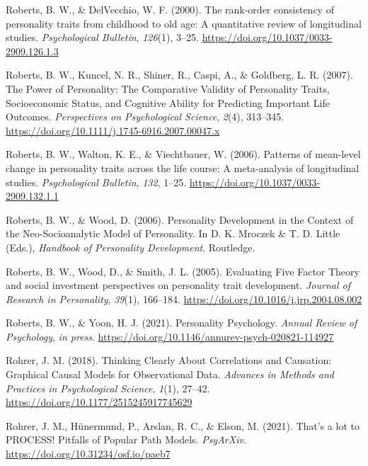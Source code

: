 \documentclass[
  english,
  man, noextraspace]{apa7}
\begin{document}
\leavevmode\hypertarget{ref-robertsRankorderConsistencyPersonality2000}{}%
Roberts, B. W., \& DelVecchio, W. F. (2000). The rank-order consistency of personality traits from childhood to old age: A quantitative review of longitudinal studies. \emph{Psychological Bulletin}, \emph{126}(1), 3--25. \url{https://doi.org/10.1037/0033-2909.126.1.3}

\leavevmode\hypertarget{ref-robertsPowerPersonalityComparative2007}{}%
Roberts, B. W., Kuncel, N. R., Shiner, R., Caspi, A., \& Goldberg, L. R. (2007). The Power of Personality: The Comparative Validity of Personality Traits, Socioeconomic Status, and Cognitive Ability for Predicting Important Life Outcomes. \emph{Perspectives on Psychological Science}, \emph{2}(4), 313--345. \url{https://doi.org/10.1111/j.1745-6916.2007.00047.x}

\leavevmode\hypertarget{ref-robertsPatternsMeanlevelChange2006a}{}%
Roberts, B. W., Walton, K. E., \& Viechtbauer, W. (2006). Patterns of mean-level change in personality traits across the life course: A meta-analysis of longitudinal studies. \emph{Psychological Bulletin}, \emph{132}, 1--25. \url{https://doi.org/10.1037/0033-2909.132.1.1}

\leavevmode\hypertarget{ref-robertsPersonalityDevelopmentContext2006}{}%
Roberts, B. W., \& Wood, D. (2006). Personality Development in the Context of the Neo-Socioanalytic Model of Personality. In D. K. Mroczek \& T. D. Little (Eds.), \emph{Handbook of Personality Development}. Routledge.

\leavevmode\hypertarget{ref-robertsEvaluatingFiveFactor2005}{}%
Roberts, B. W., Wood, D., \& Smith, J. L. (2005). Evaluating Five Factor Theory and social investment perspectives on personality trait development. \emph{Journal of Research in Personality}, \emph{39}(1), 166--184. \url{https://doi.org/10.1016/j.jrp.2004.08.002}

\leavevmode\hypertarget{ref-robertsPersonalityPsychology2021}{}%
Roberts, B. W., \& Yoon, H. J. (2021). Personality Psychology. \emph{Annual Review of Psychology}, \emph{in press}. \url{https://doi.org/10.1146/annurev-psych-020821-114927}

\leavevmode\hypertarget{ref-rohrerThinkingClearlyCorrelations2018}{}%
Rohrer, J. M. (2018). Thinking Clearly About Correlations and Causation: Graphical Causal Models for Observational Data. \emph{Advances in Methods and Practices in Psychological Science}, \emph{1}(1), 27--42. \url{https://doi.org/10.1177/2515245917745629}

\leavevmode\hypertarget{ref-rohrerThatLotPROCESS2021}{}%
Rohrer, J. M., Hünermund, P., Arslan, R. C., \& Elson, M. (2021). That's a lot to PROCESS! Pitfalls of Popular Path Models. \emph{PsyArXiv}. \url{https://doi.org/10.31234/osf.io/paeb7}
\end{document}
